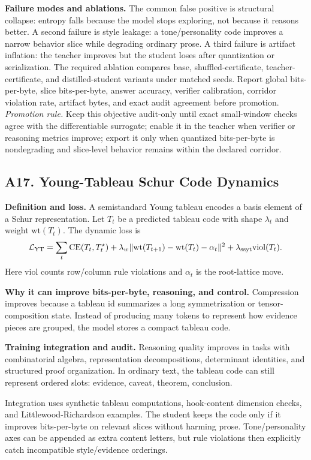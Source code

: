 \documentclass[10pt]{article}
\newcommand{\loss}{\mathcal{L}}
\numberwithin{equation}{section}
\begin{document}
\noindent\textbf{Failure modes and ablations.} The common false positive is structural collapse: entropy falls because the model stops exploring, not because it reasons better. A second failure is style leakage: a tone/personality code improves a narrow behavior slice while degrading ordinary prose. A third failure is artifact inflation: the teacher improves but the student loses after quantization or serialization. The required ablation compares base, shuffled-certificate, teacher-certificate, and distilled-student variants under matched seeds. Report global bits-per-byte, slice bits-per-byte, answer accuracy, verifier calibration, corridor violation rate, artifact bytes, and exact audit agreement before promotion.
\vfill
\noindent\emph{Promotion rule.} Keep this objective audit-only until exact small-window checks agree with the differentiable surrogate; enable it in the teacher when verifier or reasoning metrics improve; export it only when quantized bits-per-byte is nondegrading and slice-level behavior remains within the declared corridor.
\clearpage
\subsection{A17. Young-Tableau Schur Code Dynamics}
\noindent\textbf{Definition and loss.} A semistandard Young tableau encodes a basis element of a Schur representation. Let $T_t$ be a predicted tableau code with shape $\lambda_t$ and weight $\mathrm{wt}(T_t)$. The dynamic loss is
\[
\loss_{\rm YT}=\sum_t\mathrm{CE}(T_t,T_t^\star)+\lambda_w\|\mathrm{wt}(T_{t+1})-\mathrm{wt}(T_t)-\alpha_t\|^2+\lambda_{\rm ssyt}\mathrm{viol}(T_t).
\]
Here $\mathrm{viol}$ counts row/column rule violations and $\alpha_t$ is the root-lattice move.

\noindent\textbf{Why it can improve bits-per-byte, reasoning, and control.} Compression improves because a tableau id summarizes a long symmetrization or tensor-composition state. Instead of producing many tokens to represent how evidence pieces are grouped, the model stores a compact tableau code.

\noindent\textbf{Training integration and audit.} Reasoning quality improves in tasks with combinatorial algebra, representation decompositions, determinant identities, and structured proof organization. In ordinary text, the tableau code can still represent ordered slots: evidence, caveat, theorem, conclusion.

Integration uses synthetic tableau computations, hook-content dimension checks, and Littlewood-Richardson examples. The student keeps the code only if it improves bits-per-byte on relevant slices without harming prose. Tone/personality axes can be appended as extra content letters, but rule violations then explicitly catch incompatible style/evidence orderings.
\end{document}
